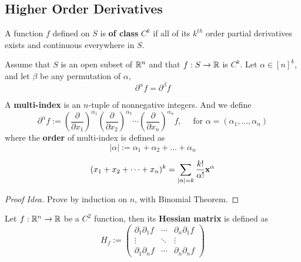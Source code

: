 \documentclass[11pt]{article}
\begin{document}
		\subsection{Higher Order Derivatives}
			\begin{definition}
				A function $f$ defined on $S$ is \textbf{of class} $C^k$ if all of its $k^{th}$ order partial derivatives exists and continuous everywhere in $S$.
			\end{definition}
			
			\begin{theorem}
				Assume that $S$ is an open subset of $\mathbb{R}^n$ and that $f: S \to \mathbb{R}$ is $C^k$. Let $\alpha \in [n]^k$, and let $\beta$ be any permutation of $\alpha$,
				\begin{equation}
					\partial^{\alpha} f = \partial^{\beta} f
				\end{equation}
			\end{theorem}
			
			\begin{definition}
				A \textbf{multi-index} is an $n$-tuple of nonnegative integers. And we define
				\begin{equation}
					\partial^\alpha f := (\frac{\partial}{\partial x_1 })^{\alpha_1}(\frac{\partial}{\partial x_{2} })^{\alpha_{2}}\cdots (\frac{\partial}{\partial x_n })^{\alpha_n}f, \quad\mbox{ for }\alpha = (\alpha_1,\ldots, \alpha_n)
				\end{equation}
				where the \textbf{order} of multi-index is defined as
				\begin{equation}
					|\alpha| := \alpha_1 + \alpha_2 + \dots + \alpha_n
				\end{equation}
			\end{definition}
			
			\begin{theorem}
				\begin{equation}
					(x_1 + x_2 + \cdots + x_n)^k = \sum_{|\alpha| = k} \frac{k!}{\alpha !} \textbf{x}^\alpha
				\end{equation}
				\begin{proof}[Proof Idea]
					Prove by induction on $n$, with Binomial Theorem.
				\end{proof}
			\end{theorem}
			
			\begin{definition}
				Let $f: \mathbb{R}^n \to \mathbb{R}$ be a $C^2$ function, then its \textbf{Hessian matrix} is defined as
				\begin{equation}
					H_f := \left(\begin{array}{ccc}
					\partial_1\partial_1 f & \cdots & \partial_n\partial_1 f \\
					\vdots & \ddots & \vdots \\
					\partial_1\partial_n f & \cdots & \partial_n\partial_n f 
					\end{array}\right)
				\end{equation}
			\end{definition}
			
\end{document}
